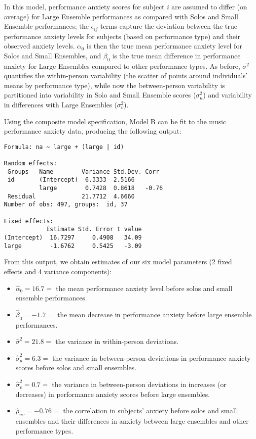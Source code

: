 \documentclass[
]{krantz}
\providecommand{\tightlist}{%
  \setlength{\itemsep}{0pt}\setlength{\parskip}{0pt}}
\begin{document}
In this model, performance anxiety scores for subject \(i\) are assumed to differ (on average) for Large Ensemble performances as compared with Solos and Small Ensemble performances; the \(\epsilon_{ij}\) terms capture the deviation between the true performance anxiety levels for subjects (based on performance type) and their observed anxiety levels. \(\alpha_{0}\) is then the true mean performance anxiety level for Solos and Small Ensembles, and \(\beta_{0}\) is the true mean difference in performance anxiety for Large Ensembles compared to other performance types. As before, \(\sigma^2\) quantifies the within-person variability (the scatter of points around individuals' means by performance type), while now the between-person variability is partitioned into variability in Solo and Small Ensemble scores (\(\sigma_{u}^{2}\)) and variability in differences with Large Ensembles (\(\sigma_{v}^{2}\)).

Using the composite model specification, Model B can be fit to the music performance anxiety data, producing the following output:

\begin{verbatim}
Formula: na ~ large + (large | id)

Random effects:
 Groups   Name        Variance Std.Dev. Corr 
 id       (Intercept)  6.3333  2.5166        
          large        0.7428  0.8618   -0.76
 Residual             21.7712  4.6660        
Number of obs: 497, groups:  id, 37

Fixed effects:
            Estimate Std. Error t value
(Intercept)  16.7297     0.4908   34.09
large        -1.6762     0.5425   -3.09
\end{verbatim}

From this output, we obtain estimates of our six model parameters (2 fixed effects and 4 variance components):

\begin{itemize}
\tightlist
\item
  \(\hat{\alpha}_{0}=16.7=\) the mean performance anxiety level before solos and small ensemble performances.
\item
  \(\hat{\beta}_{0}=-1.7=\) the mean decrease in performance anxiety before large ensemble performances.
\item
  \(\hat{\sigma}^2=21.8=\) the variance in within-person deviations.
\item
  \(\hat{\sigma}_{u}^{2}=6.3=\) the variance in between-person deviations in performance anxiety scores before solos and small ensembles.
\item
  \(\hat{\sigma}_{v}^{2}=0.7=\) the variance in between-person deviations in increases (or decreases) in performance anxiety scores before large ensembles.
\item
  \(\hat{\rho}_{uv}=-0.76=\) the correlation in subjects' anxiety before solos and small ensembles and their differences in anxiety between large ensembles and other performance types.
\end{itemize}
\end{document}
